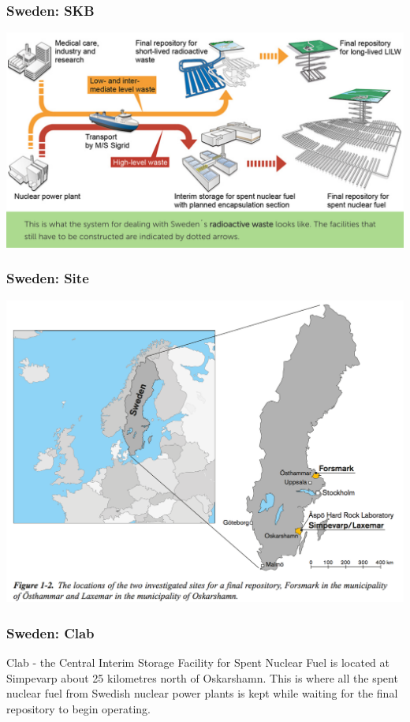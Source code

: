 \begin{frame}[c]
\frametitle{Sweden: SKB}

\cite{skb_safety_2017}
\includegraphics[width=\textwidth]{./images/sweden-plan}
\end{frame}


\begin{frame}[c]
\frametitle{Sweden: Site}
\includegraphics[width=\textwidth]{./images/sweden-site-selection}
\cite{skb_safety_2017}
\end{frame}

\begin{frame}[c]
\frametitle{Sweden: Clab}

Clab - the Central Interim Storage Facility for Spent Nuclear Fuel is located at Simpevarp about 25 kilometres north of Oskarshamn. This is where all the spent nuclear fuel from Swedish nuclear power plants is kept while waiting for the final repository to begin operating.

\end{frame}


